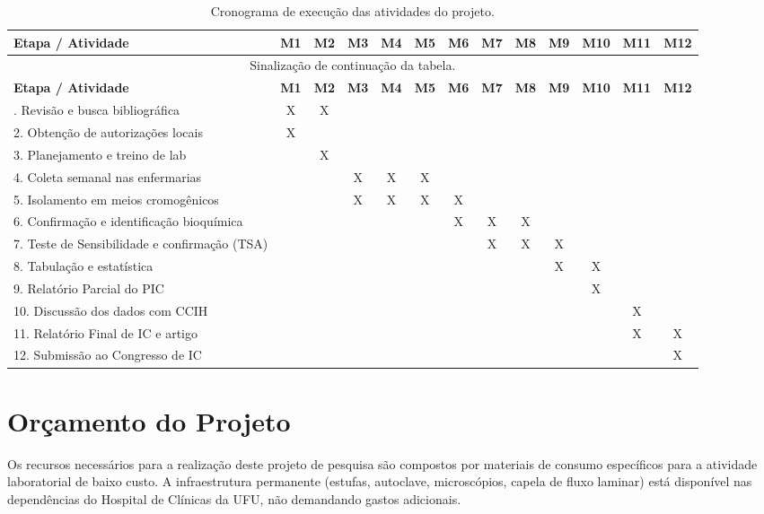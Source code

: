 \documentclass[12pt,a4paper]{article}
\begin{document}
\begin{spacing}{1.0}
\begin{longtable}{lcccccccccccc}
\caption{Cronograma de execução das atividades do projeto.}\\
\toprule
\textbf{Etapa / Atividade} & \textbf{M1} & \textbf{M2} & \textbf{M3} & \textbf{M4} & \textbf{M5} & \textbf{M6} & \textbf{M7} & \textbf{M8} & \textbf{M9} & \textbf{M10} & \textbf{M11} & \textbf{M12} \\
\midrule
\endfirsthead
\multicolumn{13}{c}{Sinalização de continuação da tabela.}\\
\toprule
\textbf{Etapa / Atividade} & \textbf{M1} & \textbf{M2} & \textbf{M3} & \textbf{M4} & \textbf{M5} & \textbf{M6} & \textbf{M7} & \textbf{M8} & \textbf{M9} & \textbf{M10} & \textbf{M11} & \textbf{M12} \\
\midrule
\endhead
\bottomrule
\endfoot
1. Revisão e busca bibliográfica & X & X & & & & & & & & & & \\
2. Obtenção de autorizações locais & X & & & & & & & & & & & \\
3. Planejamento e treino de lab & & X & & & & & & & & & & \\
4. Coleta semanal nas enfermarias & & & X & X & X & & & & & & & \\
5. Isolamento em meios cromogênicos & & & X & X & X & X & & & & & & \\
6. Confirmação e identificação bioquímica & & & & & & X & X & X & & & & \\
7. Teste de Sensibilidade e confirmação (TSA) & & & & & & & X & X & X & & & \\
8. Tabulação e estatística & & & & & & & & & X & X & & \\
9. Relatório Parcial do PIC & & & & & & & & & & X & & \\
10. Discussão dos dados com CCIH & & & & & & & & & & & X & \\
11. Relatório Final de IC e artigo & & & & & & & & & & & X & X \\
12. Submissão ao Congresso de IC & & & & & & & & & & & & X \\
\bottomrule
\end{longtable}
\endspacing
\newpage

\section{Orçamento do Projeto}
Os recursos necessários para a realização deste projeto de pesquisa são compostos por materiais de consumo específicos para a atividade laboratorial de baixo custo. A infraestrutura permanente (estufas, autoclave, microscópios, capela de fluxo laminar) está disponível nas dependências do Hospital de Clínicas da UFU, não demandando gastos adicionais.


\end{spacing}
\end{document}

